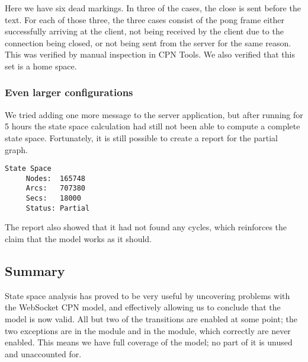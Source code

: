 	Here we have six dead markings. In three of the cases, the close is sent before
	the text. For each of those three, the three cases consist of the pong frame
	either successfully arriving at the client, not being received by the client due
	to the connection being closed, or not being sent from the server for the same
	reason. This was verified by manual inspection in CPN Tools. We also verified
	that this set is a home space.

	\subsubsection{Even larger configurations}
	We tried adding one more message to the server application, but after running for
	5 hours the state space calculation had still not been able to compute a
	complete state space. Fortunately, it is still possible to create a report for
	the partial graph. 
	\begin{lstlisting}[language={},float]
  State Space
     Nodes:  165748
     Arcs:   707380
     Secs:   18000
     Status: Partial
	\end{lstlisting}
	The report also showed that it had not found any cycles, which reinforces the
	claim that the model works as it should.
	
	\subsection{Summary}
	State space analysis has proved to be very useful by uncovering problems
	with the WebSocket CPN model, and effectively allowing us to conclude that the
	model is now valid.  All but two of the transitions are enabled at some point;
	the two exceptions are  in the 
	module and  in the  module,
	which correctly are never enabled.
	This means we have full coverage of the model; no part of it is unused and
	unaccounted for.
